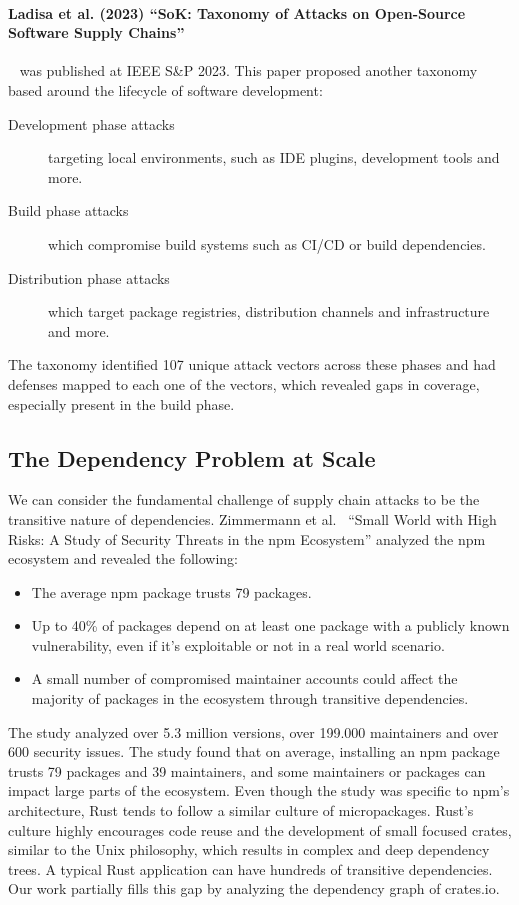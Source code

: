 \paragraph{Ladisa et al. (2023) ``SoK: Taxonomy of Attacks on Open-Source Software Supply Chains''}~\cite{ladisa2023taxonomy} was published at IEEE S\&P 2023. This paper proposed another taxonomy based around the lifecycle of software development:
\begin{description}
	\item[Development phase attacks] targeting local environments, such as IDE plugins, development tools and more.
	\item[Build phase attacks] which compromise build systems such as CI/CD or build dependencies.
	\item[Distribution phase attacks] which target package registries, distribution channels and infrastructure and more.
\end{description}

The taxonomy identified 107 unique attack vectors across these phases and had defenses mapped to each one of the vectors, which revealed gaps in coverage, especially present in the build phase.

\subsection{The Dependency Problem at Scale}\label{sect:dependency-problem}

We can consider the fundamental challenge of supply chain attacks to be the transitive nature of dependencies. Zimmermann et al.~\cite{zimmermann2019small} ``Small World with High Risks: A Study of Security Threats in the npm Ecosystem'' analyzed the npm ecosystem and revealed the following:
\begin{itemize}
	\item The average npm package trusts 79 packages.
	\item Up to 40\% of packages depend on at least one package with a publicly known vulnerability, even if it's exploitable or not in a real world scenario.
	\item A small number of compromised maintainer accounts could affect the majority of packages in the ecosystem through transitive dependencies.
\end{itemize}

The study analyzed over 5.3 million versions, over 199.000 maintainers and over 600 security issues. The study found that on average, installing an npm package trusts 79 packages and 39 maintainers, and some maintainers or packages can impact large parts of the ecosystem. Even though the study was specific to npm's architecture, Rust tends to follow a similar culture of micropackages. Rust's culture highly encourages code reuse and the development of small focused crates, similar to the Unix philosophy, which results in complex and deep dependency trees. A typical Rust application can have hundreds of transitive dependencies.
Our work partially fills this gap by analyzing the dependency graph of crates.io.


